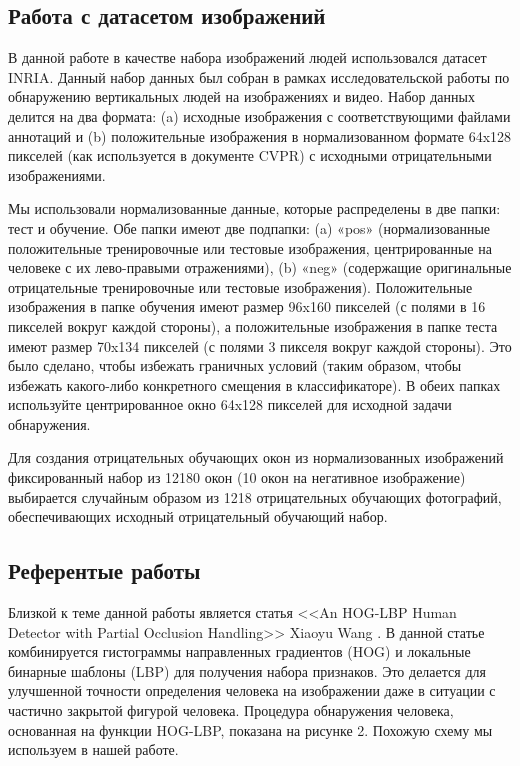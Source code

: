 \documentclass[12pt,twoside]{article}
\begin{document}
\subsection{Работа с датасетом изображений}
В данной работе в качестве набора изображений людей использовался датасет INRIA\cite{inria}. Данный набор данных был собран в рамках исследовательской работы по обнаружению вертикальных людей на изображениях и видео. Набор данных делится на два формата: (a) исходные изображения с соответствующими файлами аннотаций и (b) положительные изображения в нормализованном формате 64x128 пикселей (как используется в документе CVPR) с исходными отрицательными изображениями.

Мы использовали нормализованные данные, которые распределены в две папки: тест и обучение. Обе папки имеют две подпапки: (a) «pos» (нормализованные положительные тренировочные или тестовые изображения, центрированные на человеке с их лево-правыми отражениями), (b) «neg» (содержащие оригинальные отрицательные тренировочные или тестовые изображения). Положительные изображения в папке обучения имеют размер 96x160 пикселей (с полями в 16 пикселей вокруг каждой стороны), а положительные изображения в папке теста имеют размер 70x134 пикселей (с полями 3 пикселя вокруг каждой стороны). Это было сделано, чтобы избежать граничных условий (таким образом, чтобы избежать какого-либо конкретного смещения в классификаторе). В обеих папках используйте центрированное окно 64x128 пикселей для исходной задачи обнаружения.

Для создания отрицательных обучающих окон из нормализованных изображений фиксированный набор из 12180 окон (10 окон на негативное изображение) выбирается случайным образом из 1218 отрицательных обучающих фотографий, обеспечивающих исходный отрицательный обучающий набор.

\subsection{Референтые работы}
Близкой к теме данной работы является статья <<An HOG-LBP Human Detector with Partial Occlusion Handling>> Xiaoyu Wang \cite{Wang09}. В данной статье комбинируется гистограммы направленных градиентов (HOG) и локальные бинарные шаблоны (LBP) для получения набора признаков. Это делается для улучшенной точности определения человека на изображении даже в ситуации с частично закрытой фигурой человека. Процедура обнаружения человека, основанная на функции HOG-LBP, показана на рисунке 2. Похожую схему мы используем в нашей работе.
\end{document}

